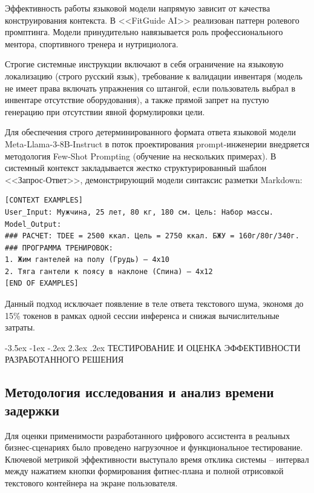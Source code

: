\documentclass[14pt, a4paper]{extarticle}
\makeatletter
\renewcommand\section{\@startsection {section}{1}{\z@}%
                                   {-3.5ex \@plus -1ex \@minus -.2ex}%
                                   {2.3ex \@plus.2ex}%
                                   {\centering\normalfont\Large\bfseries}}
\makeatother
\begin{document}
Эффективность работы языковой модели напрямую зависит от качества конструирования контекста. В <<FitGuide AI>> реализован паттерн ролевого промптинга. Модели принудительно навязывается роль профессионального ментора, спортивного тренера и нутрициолога.

Строгие системные инструкции включают в себя ограничение на языковую локализацию (строго русский язык), требование к валидации инвентаря (модель не имеет права включать упражнения со штангой, если пользователь выбрал в инвентаре отсутствие оборудования), а также прямой запрет на пустую генерацию при отсутствии явной формулировки цели.

Для обеспечения строго детерминированного формата ответа языковой модели Meta-Llama-3-8B-Instruct в поток проектирования prompt-инженерии внедряется методология Few-Shot Prompting (обучение на нескольких примерах). В системный контекст закладывается жестко структурированный шаблон <<Запрос-Ответ>>, демонстрирующий модели синтаксис разметки Markdown:

\begin{verbatim}
[CONTEXT EXAMPLES]
User_Input: Мужчина, 25 лет, 80 кг, 180 см. Цель: Набор массы.
Model_Output:
### РАСЧЕТ: TDEE = 2500 ккал. Цель = 2750 ккал. БЖУ = 160г/80г/340г.
### ПРОГРАММА ТРЕНИРОВОК:
1. Жим гантелей на полу (Грудь) — 4х10
2. Тяга гантели к поясу в наклоне (Спина) — 4х12
[END OF EXAMPLES]
\end{verbatim}

Данный подход исключает появление в теле ответа текстового шума, экономя до 15\% токенов в рамках одной сессии инференса и снижая вычислительные затраты.


\newpage
\section{ТЕСТИРОВАНИЕ И ОЦЕНКА ЭФФЕКТИВНОСТИ РАЗРАБОТАННОГО РЕШЕНИЯ}

\subsection{Методология исследования и анализ времени задержки}

Для оценки применимости разработанного цифрового ассистента в реальных бизнес-сценариях было проведено нагрузочное и функциональное тестирование. Ключевой метрикой эффективности выступало время отклика системы -- интервал между нажатием кнопки формирования фитнес-плана и полной отрисовкой текстового контейнера на экране пользователя.
\end{document}
